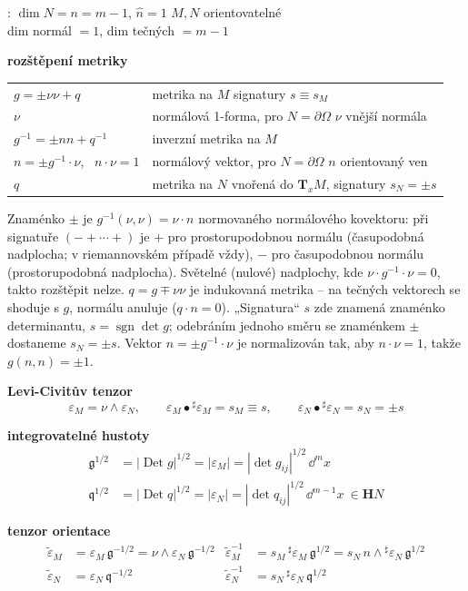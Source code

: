 : \quad $\dim N = n = m-1$, \quad $\hat n = 1$ \hfill $M, N$ orientovatelné \\
\quad dim normál $= 1$, \quad dim tečných $= m-1$

\textbf{rozštěpení metriky}

\begin{tabular}{@{}l@{\qquad}l}
$g = \pm\nu\nu + q$ & metrika na $M$ signatury $s\equiv s_M$ \\
$\nu$ & normálová 1-forma, pro $N = \partial\Omega$ $\nu$ vnější normála \\
$g^{-1} = \pm nn + q^{-1}$ & inverzní metrika na $M$ \\
$n = \pm g^{-1}\cdot\nu$, \ $n\cdot\nu = 1$ & normálový vektor, pro $N = \partial\Omega$ $n$ orientovaný ven \\
$q$ & metrika na $N$ vnořená do $\mathbf{T}_xM$, signatury $s_N = \pm s$
\end{tabular}

\begin{vysvetleni}
Znaménko $\pm$ je $g^{-1}(\nu,\nu)=\nu\cdot n$ normovaného normálového kovektoru: při signatuře $({-}{+}\cdots{+})$ je $+$ pro prostorupodobnou normálu (časupodobná nadplocha; v riemannovském případě vždy), $-$ pro časupodobnou normálu (prostorupodobná nadplocha). Světelné (nulové) nadplochy, kde $\nu\cdot g^{-1}\cdot\nu=0$, takto rozštěpit nelze. $q=g\mp\nu\nu$ je indukovaná metrika -- na tečných vektorech se shoduje s $g$, normálu anuluje ($q\cdot n=0$). „Signatura“ $s$ zde znamená znaménko determinantu, $s=\operatorname{sgn}\det g$; odebráním jednoho směru se znaménkem $\pm$ dostaneme $s_N=\pm s$. Vektor $n=\pm g^{-1}\cdot\nu$ je normalizován tak, aby $n\cdot\nu=1$, takže $g(n,n)=\pm1$.
\end{vysvetleni}

\textbf{Levi-Civitův tenzor}
\[
  \varepsilon_M = \nu\wedge\varepsilon_N, \qquad
  \varepsilon_M\bullet{}^\sharp\varepsilon_M = s_M\equiv s, \qquad
  \varepsilon_N\bullet{}^\sharp\varepsilon_N = s_N = \pm s
\]

\textbf{integrovatelné hustoty}
\begin{align*}
  \mathfrak{g}^{1/2} &= |\operatorname{Det}g|^{1/2} = |\varepsilon_M| = |\det g_{ij}|^{1/2}\,\dd^m x \\
  \mathfrak{q}^{1/2} &= |\operatorname{Det}q|^{1/2} = |\varepsilon_N| = |\det q_{ij}|^{1/2}\,\dd^{m-1}x \ \in\mathbf{H}N
\end{align*}

\textbf{tenzor orientace}
\begin{align*}
  \tilde\varepsilon_M &= \varepsilon_M\,\mathfrak{g}^{-1/2} = \nu\wedge\varepsilon_N\,\mathfrak{g}^{-1/2} &
  \tilde\varepsilon_M^{-1} &= s_M\,{}^\sharp\varepsilon_M\,\mathfrak{g}^{1/2} = s_N\,n\wedge{}^\sharp\varepsilon_N\,\mathfrak{g}^{1/2} \\
  \tilde\varepsilon_N &= \varepsilon_N\,\mathfrak{q}^{-1/2} &
  \tilde\varepsilon_N^{-1} &= s_N\,{}^\sharp\varepsilon_N\,\mathfrak{q}^{1/2}
\end{align*}

